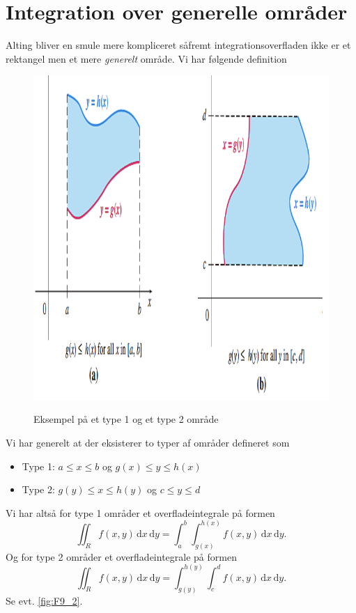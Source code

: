 \section{Integration over generelle områder}
Alting bliver en smule mere kompliceret såfremt integrationsoverfladen ikke er et rektangel men et mere \emph{generelt} område. Vi har følgende definition

\begin{figure} [ht]
  \centering
  \caption{Eksempel på et type 1 og et type 2 område}
  \includegraphics[width=0.4\linewidth]{./figures/F9_2.png}
  \label{fig:F9_2}
\end{figure}

\begin{definition}
  Vi har generelt at der eksisterer to typer af områder defineret som
  \begin{itemize}
    \item Type 1: $a \leq x \leq b$ og $g(x) \leq y \leq h(x)$
    \item Type 2: $g(y) \leq x \leq h(y)$ og $c \leq y \leq d$
  \end{itemize}
  Vi har altså for type 1 områder et overfladeintegrale på formen
  \[ 
  \iint_{R} f(x,y) \, \mathrm{d}x \, \mathrm{d}y = \int_{a}^{b} \int_{g(x)}^{h(x)} f(x,y) \, \mathrm{d}x \, \mathrm{d}y  
  .\]
  Og for type 2 områder et overfladeintegrale på formen
  \[ 
  \iint_R f(x,y) \, \mathrm{d}x \, \mathrm{d}y = \int_{g(y)}^{h(y)} \int_{c}^{d} f(x,y) \, \mathrm{d}x \, \mathrm{d}y 
  .\]
  Se evt. \autoref{fig:F9_2}.
\end{definition}

